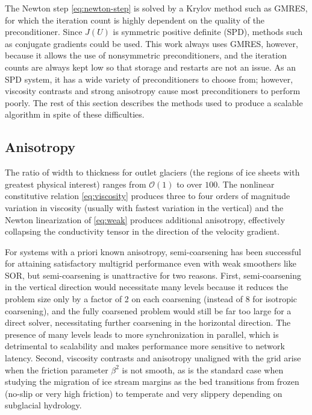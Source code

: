 \documentclass[3p]{elsarticle}
\newcommand{\bigO}{{\mathcal{O}}}
\begin{document}
The Newton step \eqref{eq:newton-step} is solved by a Krylov method such as GMRES, for which the iteration count is highly dependent on the quality of the preconditioner.  Since $J(U)$ is symmetric positive definite (SPD), methods such as conjugate gradients could be used. This work always uses GMRES, however, because it allows the use of nonsymmetric preconditioners, and the iteration counts are always kept low so that storage and restarts are not an issue.  As an SPD system, it has a wide variety of preconditioners to choose from; however, viscosity contrasts and strong anisotropy cause most preconditioners to perform poorly.  The rest of this section describes the methods used to produce a scalable algorithm in spite of these difficulties.

\subsection{Anisotropy}
The ratio of width to thickness for outlet glaciers (the regions of ice sheets with greatest physical interest) ranges from $\bigO(1)$ to over $100$.  The nonlinear constitutive relation \eqref{eq:viscosity} produces three to four orders of magnitude variation in viscosity (usually with fastest variation in the vertical) and the Newton linearization of \eqref{eq:weak} produces additional anisotropy, effectively collapsing the conductivity tensor in the direction of the velocity gradient.

For systems with a priori known anisotropy, semi-coarsening has been successful for attaining
satisfactory multigrid performance even with weak smoothers like SOR, but semi-coarsening is
unattractive for two reasons.  First, semi-coarsening in the vertical direction would necessitate
many levels because it reduces the problem size only by a factor of 2 on each coarsening (instead of
8 for isotropic coarsening), and the fully coarsened problem would still be far too large for a
direct solver, necessitating further coarsening in the horizontal direction.  The presence of many
levels leads to more synchronization in parallel, which is detrimental to scalability and makes
performance more sensitive to network latency.  Second, viscosity contrasts and anisotropy
unaligned with the grid arise when the friction parameter $\beta^2$ is not smooth, as is the standard
case when studying the migration of ice stream margins as the bed transitions from frozen (no-slip
or very high friction) to temperate and very slippery depending on subglacial hydrology.
\end{document}
